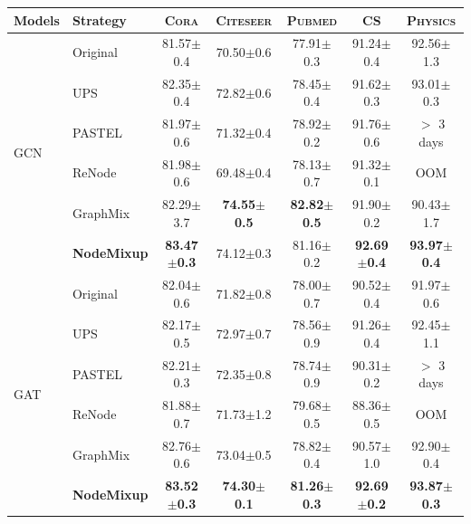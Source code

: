 \documentclass[letterpaper]{article} %
\begin{document}
\begin{table}[!htbp]
    \centering
    \begin{tabular}{l l c c c c c}
    \hline
    \toprule
    Models & Strategy & \textsc{Cora} & \textsc{Citeseer} & \textsc{Pubmed} & \textsc{CS} & \textsc{Physics}\\
    \midrule
    \multirow{6}{*}{GCN} &
    	Original & 81.57\small{$\pm$0.4} & 70.50\small{$\pm$0.6} & 77.91\small{$\pm$0.3} & 91.24\small{$\pm$0.4} & 92.56\small{$\pm$1.3} \\
    ~ & UPS & 82.35\small{$\pm$0.4} & 72.82\small{$\pm$0.6} & 78.45\small{$\pm$0.4} & 91.62\small{$\pm$0.3} & 93.01\small{$\pm$0.3} \\
    ~ & PASTEL & 81.97\small{$\pm$0.6} & 71.32\small{$\pm$0.4} & 78.92\small{$\pm$0.2} & 91.76\small{$\pm$0.6} & $>$ 3 days \\
    ~ & ReNode & 81.98\small{$\pm$0.6} & 69.48\small{$\pm$0.4} & 78.13\small{$\pm$0.7} &	91.32\small{$\pm$0.1} & OOM \\
    ~ & GraphMix & 82.29\small{$\pm$3.7} & \textbf{74.55\small{$\pm$0.5}} & \textbf{82.82\small{$\pm$0.5}} & 91.90\small{$\pm$0.2} & 90.43\small{$\pm$1.7} \\
    ~ & \textbf{NodeMixup} & \textbf{83.47\small{$\pm$0.3}} & 74.12\small{$\pm$0.3} & 81.16\small{$\pm$0.2}  & \textbf{92.69\small{$\pm$0.4}} & \textbf{93.97\small{$\pm$0.4}}\\
    \midrule
    \multirow{6}{*}{GAT} & Original & 82.04\small{$\pm$0.6} & 71.82\small{$\pm$0.8} & 78.00\small{$\pm$0.7} & 90.52\small{$\pm$0.4} & 91.97\small{$\pm$0.6}\\
    ~ & UPS & 82.17\small{$\pm$0.5} & 72.97\small{$\pm$0.7} & 78.56\small{$\pm$0.9} & 91.26\small{$\pm$0.4} & 92.45\small{$\pm$1.1} \\
    ~ & PASTEL & 82.21\small{$\pm$0.3} & 72.35\small{$\pm$0.8} & 78.74\small{$\pm$0.9} & 90.31\small{$\pm$0.2} & $>$ 3 days\\
    ~ & ReNode & 81.88\small{$\pm$0.7} & 71.73\small{$\pm$1.2} & 79.68\small{$\pm$0.5} & 88.36\small{$\pm$0.5} & OOM \\
    ~ & GraphMix & 82.76\small{$\pm$0.6} & 73.04\small{$\pm$0.5} &  78.82\small{$\pm$0.4} & 90.57\small{$\pm$1.0} & 92.90\small{$\pm$0.4} \\
    ~ & \textbf{NodeMixup} & \textbf{83.52\small{$\pm$0.3}} & \textbf{74.30\small{$\pm$0.1}} &  \textbf{81.26\small{$\pm$0.3}} &  \textbf{92.69\small{$\pm$0.2}}  &  \textbf{93.87\small{$\pm$0.3}}\\
    \midrule

\end{tabular}
\end{table}
\end{document}

